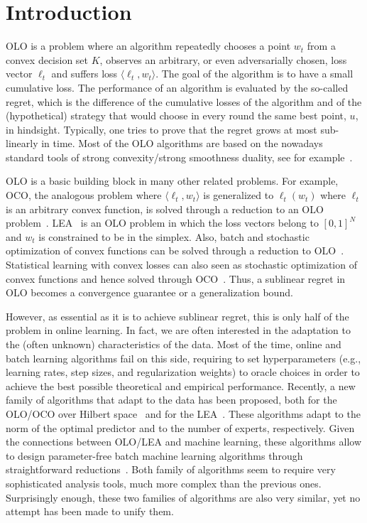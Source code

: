 \section{Introduction}
\label{section:introduction}

\ac{OLO} is a problem where an algorithm repeatedly chooses a point $w_t$ from
a convex decision set $K$, observes an arbitrary, or even adversarially chosen,
loss vector $\ell_t$ and suffers loss $\langle \ell_t, w_t \rangle$. The goal
of the algorithm is to have a small cumulative loss. The performance of an
algorithm is evaluated by the so-called regret, which is the difference of the
cumulative losses of the algorithm and of the (hypothetical) strategy that
would choose in every round the same best point, $u$, in hindsight. Typically,
one tries to prove that the regret grows at most sub-linearly in time. Most of
the \ac{OLO} algorithms are based on the nowadays standard tools of strong
convexity/strong smoothness duality, see for example~\citet{Shalev-Shwartz12}.

\ac{OLO} is a basic building block in many other related problems. For example,
\ac{OCO}, the analogous problem where $\langle \ell_t, w_t \rangle$ is
generalized to $\ell_t(w_t)$ where $\ell_t$ is an arbitrary convex function, is
solved through a reduction to an \ac{OLO}
problem~\citep{Cesa-BianchiL06,Shalev-Shwartz12}.
\ac{LEA}~\citep{LittlestoneW94,Vovk98,Cesa-BianchiFHHSW97} is an \ac{OLO}
problem in which the loss vectors belong to $[0,1]^N$ and $w_t$ is constrained
to be in the simplex. Also, batch and stochastic optimization of convex
functions can be solved through a reduction to
\ac{OLO}~\citep{Shalev-Shwartz12}. Statistical learning with convex losses can
also seen as stochastic optimization of convex functions and hence solved
through \ac{OCO}~\citep{Munro1951}. Thus, a sublinear regret in \ac{OLO} becomes
a convergence guarantee or a generalization bound.

However, as essential as it is to achieve sublinear regret, this is only half of
the problem in online learning. In fact, we are often interested in the
adaptation to the (often unknown) characteristics of the data. Most of the time,
online and batch learning algorithms fail on this side, requiring to set
hyperparameters (e.g., learning rates, step sizes, and regularization weights)
to oracle choices in order to achieve the best possible theoretical and
empirical performance. Recently, a new family of algorithms that adapt to the
data has been proposed, both for the \ac{OLO}/\ac{OCO} over Hilbert
space~\citep{StreeterM12,Orabona13,McMahanA13,McMahanO14,Orabona14} and for the
\ac{LEA}~\citep{ChaudhuriYH09,ChernovV10,LuoE14,LuoS15,KoolenE15}. These
algorithms adapt to the norm of the optimal predictor and to the number of
experts, respectively. Given the connections between \ac{OLO}/\ac{LEA} and
machine learning, these algorithms allow to design parameter-free batch machine
learning algorithms through straightforward reductions~\citep{Orabona14,LuoS15}.
Both family of algorithms seem to require very sophisticated analysis tools,
much more complex than the previous ones. Surprisingly enough, these two
families of algorithms are also very similar, yet no attempt has been made to
unify them.

